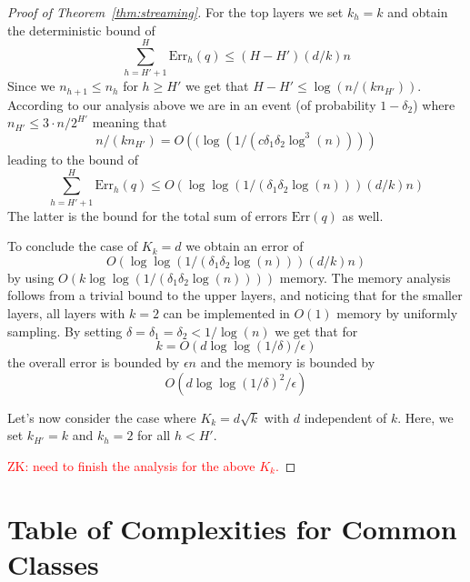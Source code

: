 \documentclass[anon,12pt]{colt2019} %
\newcommand{\zk}[1]{\textcolor{red}{ZK: #1}}
\newcommand{\eps}{\epsilon}
\begin{document}
\begin{proof} [Proof of Theorem~\ref{thm:streaming}]
For the top layers we set $k_h=k$ and obtain the deterministic bound of 
$$ \sum_{h=H'+1}^H \text{Err}_h(q) \leq (H-H')(d/k)n $$
Since we $n_{h+1} \leq n_h$ for $h \geq H'$ we get that $H-H' \leq \log(n/(kn_{H'}))$. According to our analysis above we are in an event (of probability $1-\delta_2$) where $n_{H'} \leq 3 \cdot n/2^{H'}  $ meaning that
$$ n/(kn_{H'}) = O\left((\log\left(1/\left(c \delta_1 \delta_2 \log^3(n)\right)\right)\right) $$
leading to the bound of 
$$ \sum_{h=H'+1}^H \text{Err}_h(q) \leq O\left( \log \log\left( 1/\left( \delta_1\delta_2\log(n) \right)\right)(d/k)n \right)$$
The latter is the bound for the total sum of errors $\text{Err}(q)$ as well.

To conclude the case of $K_k=d$ we obtain an error of 
$$O\left( \log \log\left( 1/\left( \delta_1\delta_2\log(n) \right)\right)(d/k)n \right)$$
by using $O(k\log \log\left( 1/\left( \delta_1\delta_2\log(n) \right)\right))$ memory. The memory analysis follows from a trivial bound to the upper layers, and noticing that for the smaller layers, all layers with $k=2$ can be implemented in $O(1)$ memory by uniformly sampling. By setting $\delta=\delta_1=\delta_2 < 1/\log(n)$ we get that for 
$$ k=O(d\log\log(1/\delta)/\eps) $$
the overall error is bounded by $\eps n$ and the memory is bounded by 
$$ O(d\log\log(1/\delta)^2/\eps) $$

Let's now consider the case where $K_k = d\sqrt{k}$ with $d$ independent of $k$. Here, we set $k_{H'}=k$ and $k_h=2$ for all $h<H'$.

\zk{need to finish the analysis for the above $K_k$.}
\end{proof}





\section{Table of Complexities for Common Classes}
\end{document}
